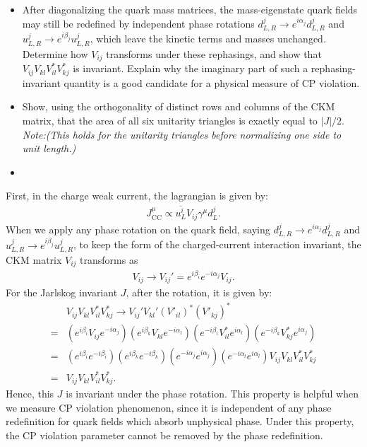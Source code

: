 \begin{itemize}
    \item [(a)]After diagonalizing the quark mass matrices, the mass-eigenstate quark fields may still be redefined by independent phase rotations $d_{L,R}^j\to e^{i\alpha_{j}} d_{L,R}^j$ and $u_{L,R}^j\to e^{i\beta_{j}} u_{L,R}^j$, which leave the kinetic terms and masses unchanged. Determine how $V_{ij}$ transforms under these rephasings, and show that $V_{ij} V_{kl} V_{il}^* V_{kj}^*$ is invariant. Explain why the imaginary part of such a rephasing-invariant quantity is a good candidate for a physical measure of CP violation.
    \item [(b)] Show, using the orthogonality of distinct rows and columns of the CKM matrix, that the area of all six unitarity triangles is exactly equal to $|J|/2$. \textit{Note:(This holds for the unitarity triangles before normalizing one side to unit length.)}
\end{itemize}

\answer{}
\begin{itemize}
    \item [(a)]
\end{itemize}
First, in the charge weak current, the lagrangian is given by: 
\begin{align}
    J_\text{CC}^\mu \propto \overline{u_L^i} V_{ij}\gamma^\mu d_L^j.
\end{align}
When we apply any phase rotation on the quark field, saying $d_{L,R}^j\to e^{i\alpha_{j}} d_{L,R}^j$ and $u_{L,R}^j\to e^{i\beta_{j}} u_{L,R}^j$, to keep the form of the charged-current interaction invariant, the CKM matrix $V_{ij}$ transforms as 
\begin{align}
    V_{ij}\to V_{ij}'= e^{i\beta_i}e^{-i\alpha_j}V_{ij}.
\end{align}
For the Jarlskog invariant $J$, after the rotation, it is given by:
\begin{align}
    &V_{ij} V_{kl} V_{il}^* V_{kj}^*\to V_{ij}' V_{kl}' (V'_{il})^* (V'_{kj})^* \\
    =& (e^{i\beta_i} V_{ij} e^{-i\alpha_j}) (e^{i\beta_k} V_{kl} e^{-i\alpha_l}) (e^{-i\beta_i} V_{il}^* e^{i\alpha_l}) (e^{-i\beta_k} V_{kj}^* e^{i\alpha_j})  \\
    =& (e^{i\beta_i} e^{-i\beta_i}) (e^{i\beta_k} e^{-i\beta_k}) (e^{-i\alpha_j} e^{i\alpha_j}) (e^{-i\alpha_l} e^{i\alpha_l}) V_{ij} V_{kl} V_{il}^* V_{kj}^*  \\
    =& V_{ij} V_{kl} V_{il}^* V_{kj}^*.
\end{align}
Hence, this $J$ is invariant under the phase rotation. This property is helpful when we measure CP violation phenomenon, since it is independent of any phase redefinition for quark fields which absorb unphysical phase. Under this property, the CP violation parameter cannot be removed by the phase redefinition.

